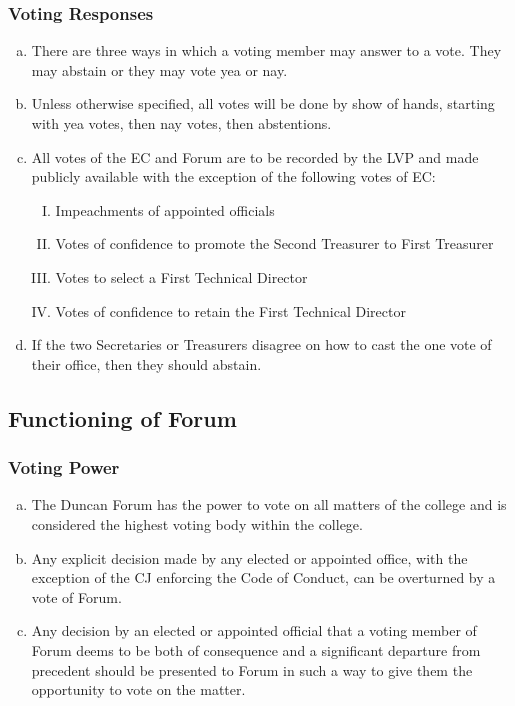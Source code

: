 \documentclass[USletter,12pt]{article}
\begin{document}
\subsubsection{Voting Responses}
\begin{enumerate}[(a)]
\item There are three ways in which a voting member may answer to a vote.  They may abstain or they may vote yea or nay.
\item Unless otherwise specified, all votes will be done by show of hands, starting with yea votes, then nay votes, then abstentions.
\item All votes of the EC and Forum are to be recorded by the LVP and made publicly available with the exception of the following votes of EC:
	\begin{enumerate}[(I)]
	\item Impeachments of appointed officials
	\item Votes of confidence to promote the Second Treasurer to First Treasurer
	\item Votes to select a First Technical Director
	\item Votes of confidence to retain the First Technical Director
	\end{enumerate}
\item If the two Secretaries or Treasurers disagree on how to cast the one vote of their office, then they should abstain.
\end{enumerate}


\subsection{Functioning of Forum}


\subsubsection{Voting Power}
\begin{enumerate}[(a)]
\item The Duncan Forum has the power to vote on all matters of the college and is considered the highest voting body within the college.
\item Any explicit decision made by any elected or appointed office, with the exception of the CJ enforcing the Code of Conduct, can be overturned by a vote of Forum.
\item Any decision by an elected or appointed official that a voting member of Forum deems to be both of consequence and a significant departure from precedent should be presented to Forum in such a way to give them the opportunity to vote on the matter.
\end{enumerate}
\end{document}
